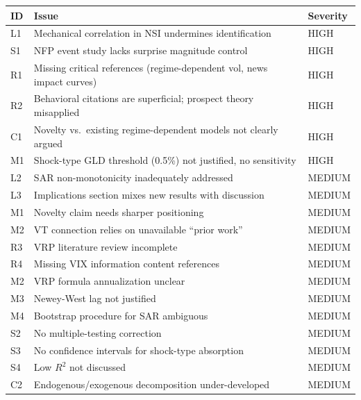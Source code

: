 \documentclass[12pt,a4paper]{article}
\begin{document}
\begin{longtable}{p{1.2cm}p{12cm}p{2cm}}
\toprule
\textbf{ID} & \textbf{Issue} & \textbf{Severity} \\
\midrule
\endhead
L1 & Mechanical correlation in NSI undermines identification & \textcolor{errorred}{HIGH} \\
S1 & NFP event study lacks surprise magnitude control & \textcolor{errorred}{HIGH} \\
R1 & Missing critical references (regime-dependent vol, news impact curves) & \textcolor{errorred}{HIGH} \\
R2 & Behavioral citations are superficial; prospect theory misapplied & \textcolor{errorred}{HIGH} \\
C1 & Novelty vs.\ existing regime-dependent models not clearly argued & \textcolor{errorred}{HIGH} \\
M1 & Shock-type GLD threshold (0.5\%) not justified, no sensitivity & \textcolor{errorred}{HIGH} \\
\midrule
L2 & SAR non-monotonicity inadequately addressed & \textcolor{warncolor}{MEDIUM} \\
L3 & Implications section mixes new results with discussion & \textcolor{warncolor}{MEDIUM} \\
M1 & Novelty claim needs sharper positioning & \textcolor{warncolor}{MEDIUM} \\
M2 & VT connection relies on unavailable ``prior work'' & \textcolor{warncolor}{MEDIUM} \\
R3 & VRP literature review incomplete & \textcolor{warncolor}{MEDIUM} \\
R4 & Missing VIX information content references & \textcolor{warncolor}{MEDIUM} \\
M2 & VRP formula annualization unclear & \textcolor{warncolor}{MEDIUM} \\
M3 & Newey-West lag not justified & \textcolor{warncolor}{MEDIUM} \\
M4 & Bootstrap procedure for SAR ambiguous & \textcolor{warncolor}{MEDIUM} \\
S2 & No multiple-testing correction & \textcolor{warncolor}{MEDIUM} \\
S3 & No confidence intervals for shock-type absorption & \textcolor{warncolor}{MEDIUM} \\
S4 & Low $R^2$ not discussed & \textcolor{warncolor}{MEDIUM} \\
C2 & Endogenous/exogenous decomposition under-developed & \textcolor{warncolor}{MEDIUM} \\

\end{longtable}
\end{document}
